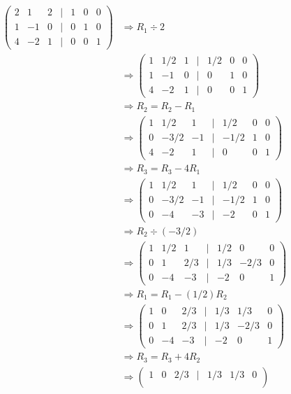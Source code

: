 \documentclass{article}
\begin{document}
\begin{align*}
\begin{pmatrix} 
2 & 1 & 2 & | & 1 & 0 & 0 \\
1 & -1 & 0 & | & 0 & 1 & 0 \\
4 & -2 & 1 & | & 0 & 0 & 1
\end{pmatrix} &\Rightarrow R_1 \div 2\\
&\Rightarrow
\begin{pmatrix} 
1 & 1/2 & 1 & | & 1/2 & 0 & 0 \\
1 & -1 & 0 & | & 0 & 1 & 0 \\
4 & -2 & 1 & | & 0 & 0 & 1
\end{pmatrix}\\
&\Rightarrow R_2 = R_2 - R_1\\
&\Rightarrow
\begin{pmatrix} 
1 & 1/2 & 1 & | & 1/2 & 0 & 0 \\
0 & -3/2 & -1 & | & -1/2 & 1 & 0 \\
4 & -2 & 1 & | & 0 & 0 & 1
\end{pmatrix}\\
&\Rightarrow R_3 = R_3 - 4R_1\\
&\Rightarrow
\begin{pmatrix} 
1 & 1/2 & 1 & | & 1/2 & 0 & 0 \\
0 & -3/2 & -1 & | & -1/2 & 1 & 0 \\
0 & -4 & -3 & | & -2 & 0 & 1
\end{pmatrix}\\
&\Rightarrow R_2 \div (-3/2)\\
&\Rightarrow
\begin{pmatrix} 
1 & 1/2 & 1 & | & 1/2 & 0 & 0 \\
0 & 1 & 2/3 & | & 1/3 & -2/3 & 0 \\
0 & -4 & -3 & | & -2 & 0 & 1
\end{pmatrix}\\
&\Rightarrow R_1 = R_1 - (1/2)R_2\\
&\Rightarrow
\begin{pmatrix} 
1 & 0 & 2/3 & | & 1/3 & 1/3 & 0 \\
0 & 1 & 2/3 & | & 1/3 & -2/3 & 0 \\
0 & -4 & -3 & | & -2 & 0 & 1
\end{pmatrix}\\
&\Rightarrow R_3 = R_3 + 4R_2\\
&\Rightarrow
\begin{pmatrix} 
1 & 0 & 2/3 & | & 1/3 & 1/3 & 0 \\

\end{pmatrix}
\end{align*}
\end{document}
